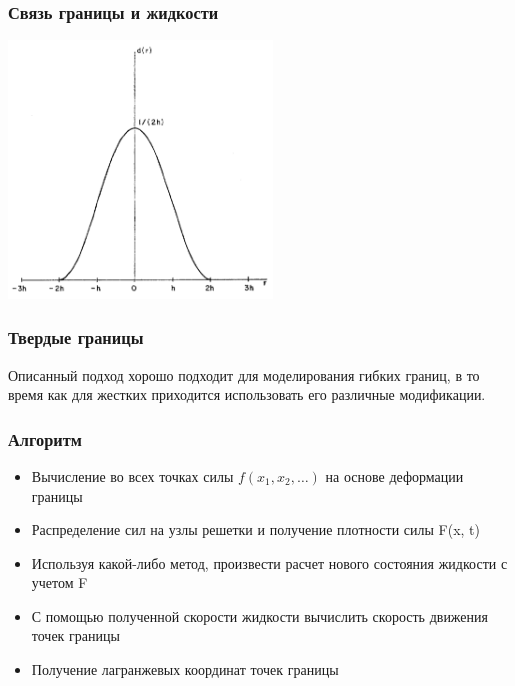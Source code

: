 \documentclass[14pt]{beamer}
\begin{document}
\begin{frame}
\frametitle{Связь границы и жидкости}
    \begin{center}
        \includegraphics[width=7cm]{immersed_boundary/delta_function.png}
    \end{center}
\end{frame}

\begin{frame}
\frametitle{Твердые границы}
Описанный подход хорошо подходит для моделирования гибких границ, в то время как для жестких приходится использовать его различные модификации.
\end{frame}

\begin{frame}
\frametitle{Алгоритм}
    \begin{itemize}
        \item \alert<+>{Вычисление во всех точках силы $f(x_1, x_2, \ldots)$ на основе деформации границы}
        \item \alert<+>{Распределение сил на узлы решетки и получение плотности силы F(x, t)}
        \item \alert<+>{Используя какой-либо метод, произвести расчет нового состояния жидкости с учетом F}
        \item \alert<+>{С помощью полученной скорости жидкости вычислить скорость движения точек границы}
        \item \alert<+>{Получение лагранжевых координат точек границы}
    \end{itemize}
\end{frame}
\end{document}
